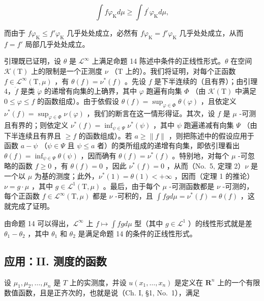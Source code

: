 \[
\int f \varphi_ {\mathrm{K}} d \mu \geqslant \int f ^ {\prime} \varphi_ {\mathrm{K}} d \mu ,
\]

而由于 \(f\varphi_{\mathrm{K}} \leqslant f'\varphi_{\mathrm{K}}\) 几乎处处成立，必然有 \(f\varphi_{\mathrm{K}} = f'\varphi_{\mathrm{K}}\) 几乎处处成立，从而 \(f = f'\) 局部几乎处处成立。

引理既已证明，设 \(\theta\) 是 \(\mathcal{L}^{\infty}\) 上满足命题 14 陈述中条件的正线性形式。\(\theta\) 在空间 \(\mathcal{K}(\mathrm{T})\) 上的限制是一个正测度 \(\nu\) （\(\mathrm{T}\) 上的）。我们将证明，对每个正函数 \(f\in \mathcal{L}^{\infty}(\mathrm{T},\mu)\) ，有 \(\theta (f) = \nu^{*}(f)\) 。先设 \(f\) 是下半连续的（且有界）；由引理 4，\(\dot{f}\) 是类 \(\dot{\varphi}\) 的递增有向集的上确界，其中 \(\varphi\) 跑遍有向集 \(\Phi\) （由 \(\mathcal{K}(\mathrm{T})\) 中满足 \(0\leqslant \varphi \leqslant f\) 的函数组成）。由于依假设 \(\theta (f) = \sup_{\varphi \in \Phi}\theta (\varphi)\) ，且依定义 \(\nu^{*}(f) = \sup_{\varphi \in \Phi}\nu (\varphi)\) ，我们的断言在这一情形得证。其次，设 \(f\) 是 \(\mu\) -可测且有界的；则依定义 \(\nu^{*}(f) = \inf_{\psi \in \Psi}\nu^{*}(\psi)\) ，其中 \(\psi\) 跑遍递减有向集 \(\Psi\) （由下半连续且有界且 \(\geqslant f\) 的函数组成）。若 \(a\geqslant \| f\|\) ，则把陈述中的假设应用于函数 \(a - \psi\) （\(\psi \in \Psi\) 且 \(\psi \leqslant a\) 者）的类所组成的递增有向集，即依引理看出 \(\theta (f) = \inf_{\psi \in \Psi}\theta (\psi)\) ，因而确有 \(\theta (f) = \nu^{*}(f)\) 。特别地，对每个 \(\mu\) -可忽略的函数 \(f\geqslant 0\) ，有 \(\theta (f) = 0\) ，因此 \(\nu^{*}(f) = 0\) ，从而（No.~5, 定理 2）\(\nu\) 是一个以 \(\mu\) 为基的测度；此外，\(\nu^{*}(1) = \theta (1) < +\infty\) ，因而（定理 1 的推论）\(\nu = g\cdot \mu\) ，其中 \(g\in \mathcal{L}^1 (\mathrm{T},\mu)\) 。最后，由于每个 \(\mu\) -可测函数都是 \(\nu\) -可测的，每个正函数 \(f\in \mathcal{L}^{\infty}(\mathrm{T},\mu)\) 都是 \(\nu\) -可积的，且 \(\int fg d\mu = \nu^{*}(f) = \theta (f)\) ，这就完成了证明。

由命题 14 可以得出，\(\mathcal{L}^{\infty}\) 上 \(f\mapsto \int fg d\mu\) 型（其中 \(g\in \mathcal{L}^{1}\) ）的线性形式就是差 \(\theta_{1} - \theta_{2}\) ，其中 \(\theta_{1}\) 和 \(\theta_{2}\) 是满足命题 14 的条件的正线性形式。

\subsection{应用：II. 测度的函数}

设 \(\mu_1, \mu_2, \ldots, \mu_n\) 是 \(T\) 上的实测度，并设 \(u(x_1, \ldots, x_n)\) 是定义在 \(\mathbf{R}^n\) 上的一个有限数值函数，且是正齐次的，也就是说（Ch. I, §1, No.~1），满足

